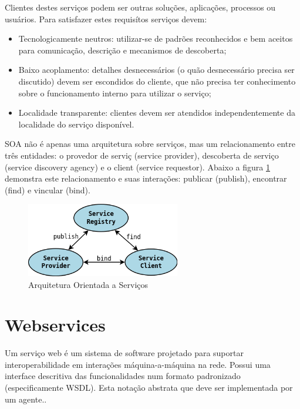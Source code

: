 Clientes destes servi\c{c}os podem ser outras solu\c{c}\~oes, aplica\c{c}\~oes, processos ou usu\'arios. Para satisfazer estes requis\'itos servi\c{c}os devem:
\begin{itemize}
\item Tecnologicamente neutros: utilizar-se de padr\~oes reconhecidos e bem aceitos para comunica\c{c}\~ao, descri\c{c}\~ao e mecanismos de descoberta;
\item Baixo acoplamento: detalhes desnecess\'arios (o qu\~ao desnecess\'ario precisa ser discutido) devem ser escondidos do cliente, que n\~ao precisa ter conhecimento sobre o funcionamento interno para utilizar o servi\c{c}o;
\item Localidade transparente: clientes devem ser atendidos independentemente da localidade do servi\c{c}o dispon\'ivel.
\end{itemize}

SOA n\~ao \'e apenas uma arquitetura sobre servi\c{c}os, mas um relacionamento entre tr\^es entidades: o provedor de servi\c{c} (service provider), descoberta de servi\c{c}o (service discovery agency) e o client (service requestor).  Abaixo a figura \ref{soaOverview} demonstra este relacionamento e suas intera\c{c}\~oes: publicar (publish), encontrar (find) e vincular (bind).

\begin{figure}[h]
   \label{soaOverview}
   \centering
   \includegraphics[width=0.6\textwidth]{figuras/soa.png}
   \caption{Arquitetura Orientada a Servi\c{c}os}
\end{figure}


\section{Webservices}

Um servi\c{c}o web \'e um sistema de software projetado para suportar interoperabilidade em intera\c{c}\~oes m\'aquina-a-m\'aquina na rede. Possui uma interface descritiva das funcionalidades num formato padronizado (especificamente WSDL). Esta nota\c{c}\~ao abstrata que deve ser implementada por um agente.\cite{w3c-web-04}. 

